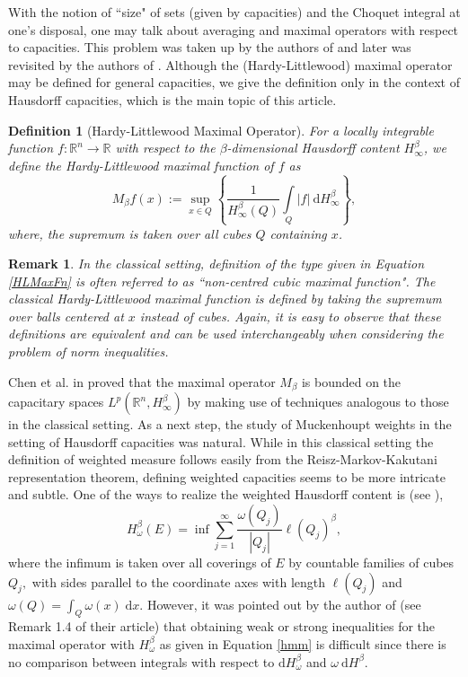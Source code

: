 \documentclass{amsart}
\newtheorem{definition}[theorem]{Definition}
\newtheorem{remark}[theorem]{Remark}
\numberwithin{theorem}{section}
\numberwithin{equation}{section}
\begin{document}
		With the notion of ``size" of sets (given by capacities) and the Choquet integral at one's disposal, one may talk about averaging and maximal operators with respect to capacities. This problem was taken up by the authors of \cite{SpectorMaximal} and later was revisited by the authors of \cite{Basak}. Although the (Hardy-Littlewood) maximal operator may be defined for general capacities, we give the definition only in the context of Hausdorff capacities, which is the main topic of this article.
		\begin{definition}[Hardy-Littlewood Maximal Operator]
			For a locally integrable function $f: \mathbb{R}^n \rightarrow \mathbb{R}$ with respect to the $\beta$-dimensional Hausdorff content $H^{\beta}_{\infty}$, we define the Hardy-Littlewood maximal function of $f$ as
			\begin{equation}
				\label{HLMaxFn}
				M_{\beta}f \left( x \right) := \sup\limits_{x \in Q} \left\lbrace \frac{1}{H^{\beta}_{\infty} \left( Q \right)} \int\limits_{Q} |f| \ \mathrm{d}H^{\beta}_{\infty} \right\rbrace,
			\end{equation}
			where, the supremum is taken over all cubes $Q$ containing $x$.
		\end{definition}
		\begin{remark}
			\normalfont
			In the classical setting, definition of the type given in Equation \eqref{HLMaxFn} is often referred to as ``\textit{non-centred cubic maximal function}". The classical Hardy-Littlewood maximal function is defined by taking the supremum over balls centered at $x$ instead of cubes. Again, it is easy to observe that these definitions are equivalent and can be used interchangeably when considering the problem of norm inequalities.
		\end{remark}
		Chen et al. in \cite{SpectorMaximal} proved that the maximal operator $M_{\beta}$ is bounded on the capacitary spaces $L^p \left( \mathbb{R}^n, H_{\infty}^{\beta} \right)$ by making use of techniques analogous to those in the classical setting. As a next step, the study of Muckenhoupt weights in the setting of Hausdorff capacities was natural. While in this classical setting the definition of weighted measure follows easily from the Reisz-Markov-Kakutani representation theorem, defining weighted capacities seems to be more intricate and subtle. One of the ways to realize the weighted Hausdorff content is (see \cite{Tang}),
		\begin{equation}\label{hmm}
			H_\omega^\beta (E) = \inf \sum_{j=1}^{\infty}\frac{\omega(Q_j)}{|Q_j|}\ell(Q_j)^\beta,
		\end{equation}
		where the infimum is taken over all coverings of $E$ by countable families of cubes $Q_j,$ with sides parallel to the coordinate axes with length $\ell(Q_j)$ and $\omega(Q) = \int_{Q}^{}\omega(x)\;\mathrm{d}x.$ However, it was pointed out by the author of \cite{Saito} (see Remark 1.4 of their article) that obtaining weak or strong inequalities for the maximal operator with $H_\omega^{\beta}$ as given in Equation \eqref{hmm} is difficult since there is no comparison between integrals with respect to $\mathrm{d}H_\omega^\beta$ and $\omega \ \mathrm{d}H^\beta$.
		
\end{document}
